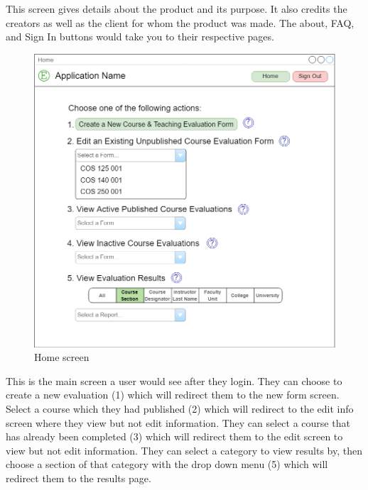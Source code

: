 \documentclass{article}
\begin{document}
This screen gives details about the product and its purpose. It also credits the creators as well as the client for whom the product was made.  The about, FAQ, and Sign In buttons would take you to their respective pages.

\begin{center}
\begin{figure}[H]
    \centering
    \caption{Home screen}
    \includegraphics[scale=.25]{images/home_screen.png}
\end{figure}
\end{center}

This is the main screen a user would see after they login. They can choose to create a new evaluation (1) which will redirect them to the new form screen. Select a course which they had published (2) which will redirect to the edit info screen where they view but not edit information.  They can select a course that has already been completed (3) which will redirect them to the edit screen to view but not edit information.  They can select a category to view results by, then choose a section of that category with the drop down menu (5) which will redirect them to the results page.
\end{document}
